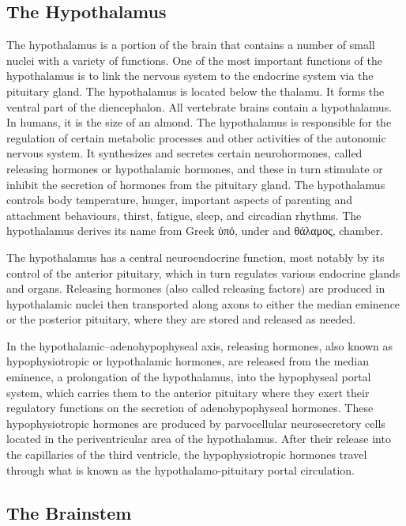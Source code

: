 \documentclass[]{book}
\begin{document}
\hypertarget{the-hypothalamus}{%
\subsection{The Hypothalamus}\label{the-hypothalamus}}

The hypothalamus is a portion of the brain that contains a number of small nuclei with a variety of functions. One of the most important functions of the hypothalamus is to link the nervous system to the endocrine system via the pituitary gland. The hypothalamus is located below the thalamu. It forms the ventral part of the diencephalon. All vertebrate brains contain a hypothalamus. In humans, it is the size of an almond. The hypothalamus is responsible for the regulation of certain metabolic processes and other activities of the autonomic nervous system. It synthesizes and secretes certain neurohormones, called releasing hormones or hypothalamic hormones, and these in turn stimulate or inhibit the secretion of hormones from the pituitary gland. The hypothalamus controls body temperature, hunger, important aspects of parenting and attachment behaviours, thirst, fatigue, sleep, and circadian rhythms. The hypothalamus derives its name from Greek ὑπό, under and θάλαμος, chamber.

The hypothalamus has a central neuroendocrine function, most notably by its control of the anterior pituitary, which in turn regulates various endocrine glands and organs. Releasing hormones (also called releasing factors) are produced in hypothalamic nuclei then transported along axons to either the median eminence or the posterior pituitary, where they are stored and released as needed.

In the hypothalamic--adenohypophyseal axis, releasing hormones, also known as hypophysiotropic or hypothalamic hormones, are released from the median eminence, a prolongation of the hypothalamus, into the hypophyseal portal system, which carries them to the anterior pituitary where they exert their regulatory functions on the secretion of adenohypophyseal hormones. These hypophysiotropic hormones are produced by parvocellular neurosecretory cells located in the periventricular area of the hypothalamus. After their release into the capillaries of the third ventricle, the hypophysiotropic hormones travel through what is known as the hypothalamo-pituitary portal circulation.

\hypertarget{the-brainstem}{%
\subsection{The Brainstem}\label{the-brainstem}}
\end{document}
